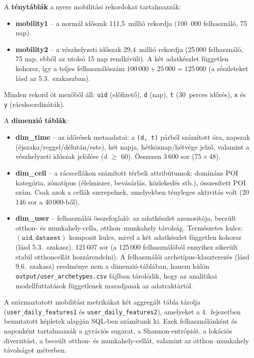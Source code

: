 A \textbf{ténytáblák} a nyers mobilitási rekordokat tartalmazzák:
\begin{itemize}
    \item \textbf{mobility1} -- a normál időszak 111{,}5~millió rekordja (100~000 felhasználó, 75 nap).
    \item \textbf{mobility2} -- a vészhelyzeti időszak 29{,}4~millió rekordja (25\,000 felhasználó, 75 nap, ebből az utolsó 15 nap rendkívüli). A két adatkészlet független kohorsz, így a teljes felhasználószám $100\,000 + 25\,000 = 125\,000$ (a részleteket lásd az 5.3.\ szakaszban).
\end{itemize}

\noindent Minden rekord öt mezőből áll: \texttt{uid} (előfizető), \texttt{d} (nap), \texttt{t} (30~perces időrés), \texttt{x} és \texttt{y} (rácskoordináták).

A \textbf{dimenzió táblák}:
\begin{itemize}
    \item \textbf{dim\_time} -- az időrések metaadatai: a \texttt{(d, t)} párból számított óra, napszak (éjszaka/reggel/délután/este), hét napja, hétköznap/hétvége jelző, valamint a vészhelyzeti időszak jelölése (d $\geq$ 60). Összesen 3\,600 sor ($75 \times 48$).
    \item \textbf{dim\_cell} -- a rácscellákon számított térbeli attribútumok: domináns POI kategória, zónatípus (élelmiszer, bevásárlás, közlekedés stb.), összesített POI szám. Csak azok a cellák szerepelnek, amelyekben tényleges aktivitás volt (20\,146 sor a 40\,000-ből).
    \item \textbf{dim\_user} -- felhasználói összefoglaló: az adatkészlet azonosítója, becsült otthon- és munkahely-cella, otthon--munkahely távolság. Természetes kulcs: \((\texttt{uid}, \texttt{dataset})\) kompozit kulcs, mivel a két adatkészlet független kohorsz (lásd 5.3.\ szakasz). 121\,607 sor (a 125\,000 felhasználóból ennyihez sikerült stabil otthoncellát hozzárendelni). A felhasználói archetípus-klaszterezés (lásd 9.6.\ szakasz) eredménye nem a dimenzió-táblában, hanem külön \texttt{output/user\_archetypes.csv} fájlban tárolódik, hogy az analitikai modellfuttatások függetlenek maradjanak az adatraktártól.
\end{itemize}

\noindent A származtatott mobilitási metrikákat két aggregált tábla tárolja (\texttt{user\_daily\_features1} és \texttt{user\_daily\_features2}), amelyeket a 4.\ fejezetben bemutatott képletek alapján SQL-ben számítunk ki. Ezek felhasználónként és naponként tartalmazzák a gyrációs sugarat, a Shannon-entrópiát, a lokációs diverzitást, a becsült otthon- és munkahely-cellát, valamint az otthon--munkahely távolságot méterben.


